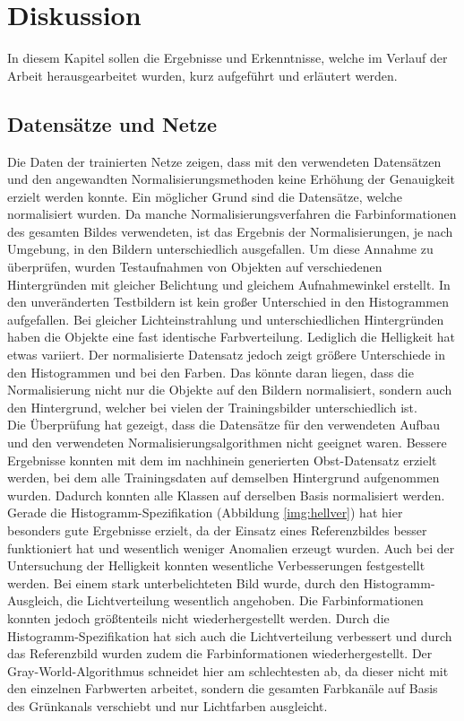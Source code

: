 \chapter{Diskussion}\label{s.diskussion}
In diesem Kapitel sollen die Ergebnisse und Erkenntnisse, welche im Verlauf der Arbeit herausgearbeitet wurden, kurz aufgeführt und erläutert werden.
\section{Datensätze und Netze}
Die Daten der trainierten Netze zeigen, dass mit den verwendeten Datensätzen und den angewandten Normalisierungsmethoden keine Erhöhung der Genauigkeit erzielt werden konnte. Ein möglicher Grund sind die Datensätze, welche normalisiert wurden. Da manche Normalisierungsverfahren die Farbinformationen des gesamten Bildes verwendeten, ist das Ergebnis der Normalisierungen, je nach Umgebung, in den Bildern unterschiedlich ausgefallen. Um diese Annahme zu überprüfen, wurden Testaufnahmen von Objekten auf verschiedenen Hintergründen mit gleicher Belichtung und gleichem Aufnahmewinkel erstellt. In den unveränderten Testbildern ist kein großer Unterschied in den Histogrammen aufgefallen. Bei gleicher Lichteinstrahlung und unterschiedlichen Hintergründen haben die Objekte eine fast identische Farbverteilung. Lediglich die Helligkeit hat etwas variiert. Der normalisierte Datensatz jedoch zeigt größere Unterschiede in den Histogrammen und bei den Farben. Das könnte daran liegen, dass die Normalisierung nicht nur die Objekte auf den Bildern normalisiert, sondern auch den Hintergrund, welcher bei vielen der Trainingsbilder unterschiedlich ist.\\ 
Die Überprüfung hat gezeigt, dass die Datensätze für den verwendeten Aufbau und den verwendeten Normalisierungsalgorithmen nicht geeignet waren. Bessere Ergebnisse konnten mit dem im nachhinein generierten Obst-Datensatz erzielt werden, bei dem alle Trainingsdaten auf demselben Hintergrund aufgenommen wurden. Dadurch konnten alle Klassen auf derselben Basis normalisiert werden. Gerade die Histogramm-Spezifikation (Abbildung \ref{img:hellver}) hat hier besonders gute Ergebnisse erzielt, da der Einsatz eines Referenzbildes besser funktioniert hat und wesentlich weniger Anomalien erzeugt wurden. Auch bei der Untersuchung der Helligkeit konnten wesentliche Verbesserungen festgestellt werden. Bei einem stark unterbelichteten Bild wurde, durch den Histogramm-Ausgleich, die Lichtverteilung wesentlich angehoben. Die Farbinformationen konnten jedoch größtenteils nicht wiederhergestellt werden. Durch die Histogramm-Spezifikation hat sich auch die Lichtverteilung verbessert und durch das Referenzbild wurden zudem die Farbinformationen wiederhergestellt. Der Gray-World-Algorithmus schneidet hier am schlechtesten ab, da dieser nicht mit den einzelnen Farbwerten arbeitet, sondern die gesamten Farbkanäle auf Basis des Grünkanals verschiebt und nur Lichtfarben ausgleicht. 
